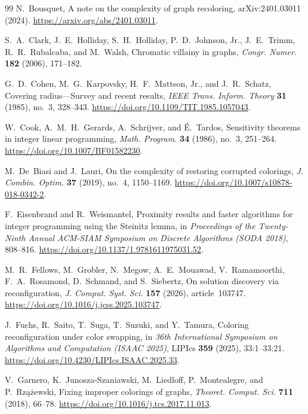 \documentclass[11pt,reqno]{amsart}
\numberwithin{equation}{section}
\theoremstyle{definition}
\theoremstyle{remark}
\begin{document}
\begin{thebibliography}{99}
N.~Bousquet,
A note on the complexity of graph recoloring,
arXiv:2401.03011 (2024).
\url{https://arxiv.org/abs/2401.03011}.

S.~A.~Clark, J.~E.~Holliday, S.~H.~Holliday, P.~D.~Johnson, Jr.,
J.~E.~Trimm, R.~R.~Rubalcaba, and M.~Walsh,
Chromatic villainy in graphs,
\emph{Congr. Numer.} \textbf{182} (2006), 171--182.

G.~D.~Cohen, M.~G.~Karpovsky, H.~F.~Mattson, Jr., and J.~R.~Schatz,
Covering radius---Survey and recent results,
\emph{IEEE Trans. Inform. Theory} \textbf{31} (1985), no.~3, 328--343.
\url{https://doi.org/10.1109/TIT.1985.1057043}.

W.~Cook, A.~M.~H.~Gerards, A.~Schrijver, and \'E.~Tardos,
Sensitivity theorems in integer linear programming,
\emph{Math. Program.} \textbf{34} (1986), no.~3, 251--264.
\url{https://doi.org/10.1007/BF01582230}.

M.~De~Biasi and J.~Lauri,
On the complexity of restoring corrupted colorings,
\emph{J. Combin. Optim.} \textbf{37} (2019), no.~4, 1150--1169.
\url{https://doi.org/10.1007/s10878-018-0342-2}.

F.~Eisenbrand and R.~Weismantel,
Proximity results and faster algorithms for integer programming using
the Steinitz lemma,
in \emph{Proceedings of the Twenty-Ninth Annual ACM-SIAM Symposium on
Discrete Algorithms (SODA 2018)}, 808--816.
\url{https://doi.org/10.1137/1.9781611975031.52}.

M.~R.~Fellows, M.~Grobler, N.~Megow, A.~E.~Mouawad,
V.~Ramamoorthi, F.~A.~Rosamond, D.~Schmand, and S.~Siebertz,
On solution discovery via reconfiguration,
\emph{J. Comput. Syst. Sci.} \textbf{157} (2026), article~103747.
\url{https://doi.org/10.1016/j.jcss.2025.103747}.

J.~Fuchs, R.~Saito, T.~Suga, T.~Suzuki, and Y.~Tamura,
Coloring reconfiguration under color swapping,
in \emph{36th International Symposium on Algorithms and Computation
(ISAAC 2025)}, LIPIcs \textbf{359} (2025), 33:1--33:21.
\url{https://doi.org/10.4230/LIPIcs.ISAAC.2025.33}.

V.~Garnero, K.~Junosza-Szaniawski, M.~Liedloff, P.~Montealegre,
and P.~Rz\k{a}\.{z}ewski,
Fixing improper colorings of graphs,
\emph{Theoret. Comput. Sci.} \textbf{711} (2018), 66--78.
\url{https://doi.org/10.1016/j.tcs.2017.11.013}.


\end{thebibliography}
\end{document}
